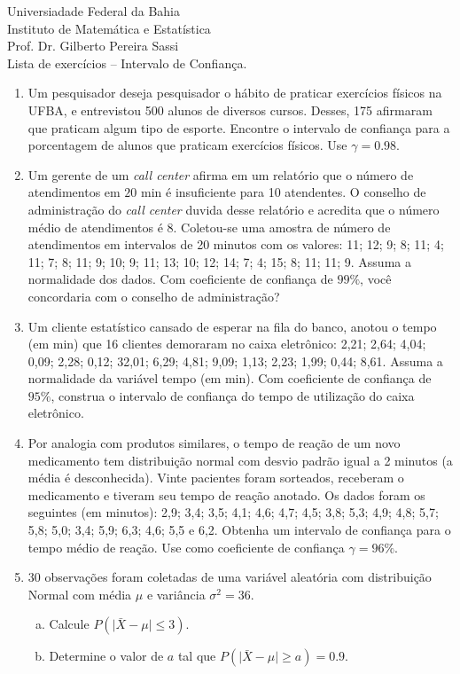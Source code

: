 \documentclass[12pt, a4paper]{article}
\begin{document}
\begin{center}
Universiadade Federal da Bahia\\
Instituto de Matemática e Estatística\\
Prof. Dr. Gilberto Pereira Sassi\\
\vspace{1cm}
Lista de exercícios -- Intervalo de Confiança.
\vspace{1cm}
\end{center}

\begin{enumerate}
    \item Um pesquisador deseja pesquisador o hábito de praticar exercícios físicos na UFBA, e entrevistou 500 alunos de diversos cursos. 
 Desses, 175 afirmaram que praticam algum tipo de esporte. Encontre o intervalo de confiança para a porcentagem de alunos que praticam exercícios físicos. Use $\gamma=0.98$.
 
  \item Um gerente de um \textit{call center} afirma em um relatório que o número de atendimentos em $20$ min é insuficiente para 10 atendentes. O conselho de administração do \textit{call center} duvida
 desse relatório e acredita que o número médio de atendimentos é 8. Coletou-se uma amostra de número de atendimentos em intervalos de 20 minutos com os valores: 11; 12; 9; 8; 11; 4; 11; 7; 8; 11; 9; 10; 9; 11; 13; 10; 12; 14; 7; 4; 15; 8; 11; 11; 9. Assuma a normalidade dos dados.
 Com coeficiente de confiança de $99\%$, você concordaria com o conselho de administração?
 
 \item Um cliente estatístico cansado de esperar na fila do banco, anotou o tempo (em min) que 16 clientes demoraram no caixa eletrônico: 2,21; 2,64; 
 4,04; 0,09; 2,28; 0,12; 32,01; 6,29; 4,81; 9,09; 1,13; 2,23; 1,99; 0,44; 8,61. Assuma a normalidade da variável tempo (em min). Com coeficiente de confiança de $95\%$, construa o intervalo de confiança do tempo de utilização 
 do caixa eletrônico.
 
 \item Por analogia com  produtos similares, o tempo de reação de um novo medicamento tem distribuição normal com desvio padrão igual a 2 minutos (a média é desconhecida). Vinte pacientes foram sorteados, receberam o medicamento e tiveram seu tempo de reação anotado. Os dados foram os seguintes (em minutos): 2,9; 3,4; 3,5; 4,1; 4,6; 4,7; 4,5; 3,8; 5,3; 4,9; 4,8; 5,7; 5,8; 5,0; 3,4; 5,9; 6,3; 4,6; 5,5 e 6,2. Obtenha um intervalo de confiança para o tempo médio de reação. Use como coeficiente de confiança $\gamma = 96\%$.
	\item 30 observações foram coletadas de uma variável aleatória com distribuição Normal com média $\mu$ e variância $\sigma^2=36$.
	\begin{enumerate}[(a)]
		\item Calcule $P(\lvert \bar{X} - \mu \rvert\leq 3)$.
		\item Determine o valor de $a$ tal que $P(\lvert \bar{X} -  \mu  \rvert \geq a) = 0.9$.
	\end{enumerate}
	

\end{enumerate}
\end{document}
